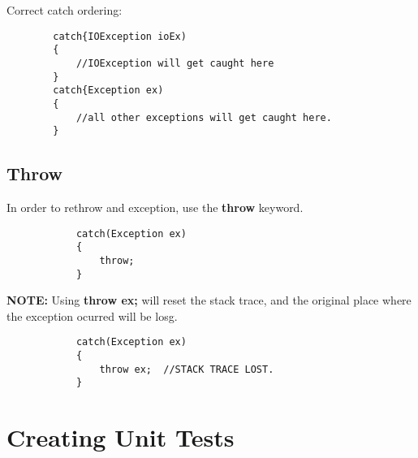 \documentclass {amsart}
\begin{document}
	Correct catch ordering:

	\begin{lstlisting}
		catch{IOException ioEx)
		{
			//IOException will get caught here
		}
		catch{Exception ex)
		{
			//all other exceptions will get caught here.
		}
	\end{lstlisting}
	\subsection{Throw}  In order to rethrow and exception, use the {\bf throw} keyword.  
		\begin{lstlisting}
			catch(Exception ex)
			{
				throw;
			}
		\end{lstlisting}
	{\bf NOTE:} Using {\bf throw ex;} will reset the stack trace, and the original place where the exception ocurred will be losg.
		\begin{lstlisting}
			catch(Exception ex)
			{
				throw ex;  //STACK TRACE LOST.
			}
		\end{lstlisting}
		

\section{Creating Unit Tests}
\end{document}
